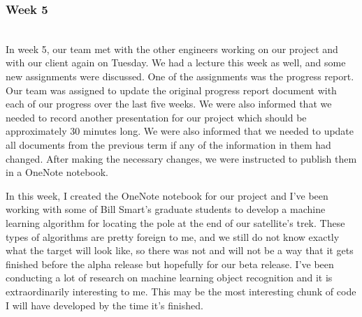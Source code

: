 \documentclass[10pt,letterpaper,onecolumn,draftclsnofoot,journal]{IEEEtran}
\begin{document}
\subsubsection{Week 5}\hspace*{\fill}\\
In week 5, our team met with the other engineers working on our project and with our client again on Tuesday. We had a lecture this week as well, and some new assignments were discussed. One of the assignments was the progress report. Our team was assigned to update the original progress report document with each of our progress over the last five weeks. We were also informed that we needed to record another presentation for our project which should be approximately 30 minutes long. We were also informed that we needed to update all documents from the previous term if any of the information in them had changed. After making the necessary changes, we were instructed to publish them in a OneNote notebook.\vspace{.3cm}
\par  
In this week, I created the OneNote notebook for our project and I've been working with some of Bill Smart's graduate students to develop a machine learning algorithm for locating the pole at the end of our satellite's trek. These types of algorithms are pretty foreign to me, and we still do not know exactly what the target will look like, so there was not and will not be a way that it gets finished before the alpha release but hopefully for our beta release. I've been conducting a lot of research on machine learning object recognition and it is extraordinarily interesting to me. This may be the most interesting chunk of code I will have developed by the time it's finished.\vspace{.3cm}
\par




%
%
\end{document}
